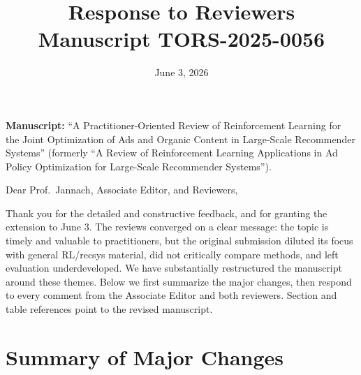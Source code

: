 \documentclass[11pt]{article}
\title{\vspace{-2.5em}Response to Reviewers\\[0.3em]
\large Manuscript TORS-2025-0056}
\author{}
\date{June 3, 2026}
\begin{document}
\maketitle
\vspace{-2.5em}

\noindent\textbf{Manuscript:} ``A Practitioner-Oriented Review of Reinforcement
Learning for the Joint Optimization of Ads and Organic Content in Large-Scale
Recommender Systems'' (formerly ``A Review of Reinforcement Learning
Applications in Ad Policy Optimization for Large-Scale Recommender Systems'').

\bigskip

\noindent Dear Prof.\ Jannach, Associate Editor, and Reviewers,

Thank you for the detailed and constructive feedback, and for granting the
extension to June 3. The reviews converged on a clear message: the topic is
timely and valuable to practitioners, but the original submission diluted its
focus with general RL/recsys material, did not critically compare methods, and
left evaluation underdeveloped. We have substantially restructured the
manuscript around these themes. Below we first summarize the major changes,
then respond to every comment from the Associate Editor and both reviewers.
Section and table references point to the revised manuscript.

\section*{Summary of Major Changes}
\end{document}
